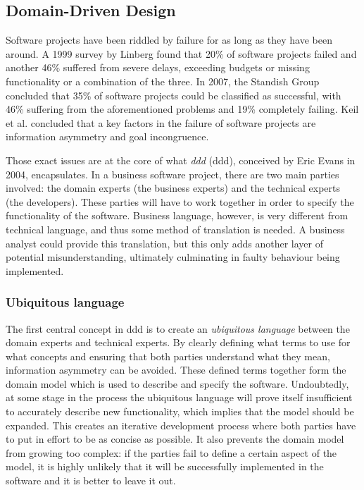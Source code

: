 \subsection{Domain-Driven Design}
\label{subsection:domaindrivendesign}
Software projects have been riddled by failure for as long as they have been around. A 1999 survey by Linberg found that 20\% of software projects failed and another 46\% suffered from severe delays, exceeding budgets or missing functionality or a combination of the three\cite{linberg1999software}. In 2007, the Standish Group concluded that 35\% of software projects could be classified as successful, with 46\% suffering from the aforementioned problems and 19\% completely failing\cite{rubinstein2007standish}. Keil et al. concluded that a key factors in the failure of software projects are information asymmetry and goal incongruence\cite{keil2000software}.

Those exact issues are at the core of what \textit{\acrlong{ddd}} (\acrshort{ddd}), conceived by Eric Evans in 2004, encapsulates. In a business software project, there are two main parties involved: the domain experts (the business experts) and the technical experts (the developers). These parties will have to work together in order to specify the functionality of the software. Business language, however, is very different from technical language, and thus some method of translation is needed. A business analyst could provide this translation, but this only adds another layer of potential misunderstanding, ultimately culminating in faulty behaviour being implemented.

\subsubsection{Ubiquitous language}
\label{subsubsection:ubiquitouslanguage}
The first central concept in \acrshort{ddd} is to create an \textit{ubiquitous language} between the domain experts and technical experts. By clearly defining what terms to use for what concepts and ensuring that both parties understand what they mean, information asymmetry can be avoided\cite{evans2004domain}. These defined terms together form the domain model which is used to describe and specify the software. Undoubtedly, at some stage in the process the ubiquitous language will prove itself insufficient to accurately describe new functionality, which implies that the model should be expanded. This creates an iterative development process where both parties have to put in effort to be as concise as possible. It also prevents the domain model from growing too complex: if the parties fail to define a certain aspect of the model, it is highly unlikely that it will be successfully implemented in the software and it is better to leave it out.

